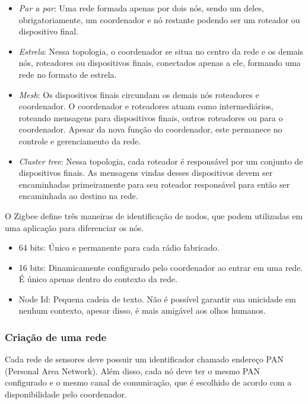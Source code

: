\begin{itemize} \parskip -4pt
	\item \textit{Par a par}: Uma rede formada apenas por dois nós, sendo um deles, obrigatoriamente, um 
	coordenador e nó restante podendo ser um roteador ou dispositivo final.
	\item \textit{Estrela}: Nessa topologia, o coordenador se situa no centro da rede e os demais nós, 
	roteadores ou dispositivos finais, conectados apenas a ele, formando uma rede no formato de 
	estrela.
	\item \textit{Mesh}: Os dispositivos finais circundam os demais nós roteadores e coordenador. O 
	coordenador e roteadores atuam como intermediários, roteando mensagens para dispositivos 
	finais, outros roteadores ou para o coordenador. Apesar da nova função do coordenador, este 
	permanece no controle e gerenciamento da rede.
	\item \textit{Cluster tree}: Nessa topologia, cada roteador é responsável por um conjunto de 
	dispositivos finais. As mensagens vindas desses dispositivos devem ser encaminhadas 
	primeiramente para seu roteador responsável para então ser encaminhada ao destino na rede.
\end{itemize}


O Zigbee define três maneiras de identificação de nodos, que podem utilizadas em uma aplicação para 
diferenciar os nós.

\begin{itemize} \parskip -4pt
	\item 64 bits: Único e permanente para cada rádio fabricado.
	\item 16 bits: Dinamicamente configurado pelo coordenador ao entrar em uma rede. É único apenas 
	dentro do contexto da rede.
	\item Node Id: Pequena cadeia de texto. Não é possível garantir sua unicidade em nenhum 
	contexto, apesar disso, é mais amigável aos olhos humanos.
\end{itemize}

\subsubsection{Criação de uma rede}

Cada rede de sensores deve possuir um identificador chamado endereço PAN (Personal Area Network). 
Além disso, cada nó deve ter o mesmo PAN configurado e o mesmo canal de comunicação, que é 
escolhido de acordo com a disponibilidade pelo coordenador. 

